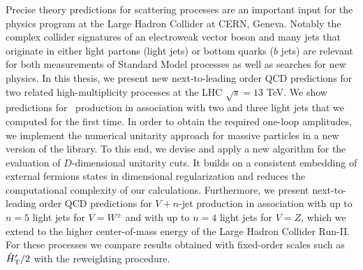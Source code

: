 Precise theory predictions for scattering processes are an important input for the physics program at the Large Hadron Collider at CERN, Geneva.
Notably the complex collider signatures of an electroweak vector boson and many jets that originate in either light partons (light jets) or
bottom quarks ($b$ jets) are relevant for both measurements of Standard Model processes as well as searches for new
physics. In this thesis, we present new next-to-leading order QCD predictions for
two related high-multiplicity processes at the LHC $\sqrt{s} =
13$ TeV. We show predictions for \Wbb~production in association with two and three light jets that
we computed for the first time. In order to obtain the required one-loop
amplitudes, we implement the numerical unitarity approach for massive
particles in a new version of the \BlackHat{} library. To this end, we devise and apply a new algorithm for the evaluation of
$D$-dimensional unitarity cuts. It builds on a consistent embedding of external fermions states in dimensional regularization and reduces the computational complexity of our calculations. Furthermore, we
present next-to-leading order QCD predictions for $V+n$-jet production in association
with up to $n=5$ light jets for $V=W^\pm$ and with up to $n=4$ light jets for
$V=Z$, which we extend to the higher
center-of-mass energy of the Large Hadron Collider Run-II. For these processes we compare results obtained with fixed-order
scales such as ${\hat H}_{\mathrm T}'/2$ with the \MINLO{} reweighting procedure.

